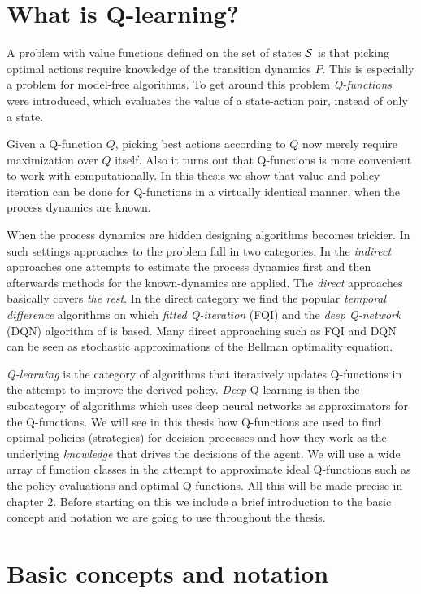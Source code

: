 \section{What is Q-learning?}

A problem with value functions defined on the set of states $\mathcal{S}$ is that
picking optimal actions require knowledge of the transition dynamics $P$.
This is especially a problem for model-free algorithms.
To get around this problem \emph{Q-functions} were introduced, which evaluates
the value of a state-action pair, instead of only a state.

Given a Q-function $Q$, picking best actions according to $Q$ now
merely require maximization over $Q$ itself.
Also it turns out that Q-functions is
more convenient to work with computationally.
In this thesis we show that value and policy iteration can be done
for Q-functions in a virtually identical manner, when the process dynamics
are known.

When the process dynamics are hidden designing algorithms becomes trickier.
In such settings approaches to the problem
fall in two categories. In the \emph{indirect} approaches
one attempts to estimate the process dynamics first and then afterwards
methods for the known-dynamics are applied.
The \emph{direct} approaches basically covers \emph{the rest}.
In the direct category we find the popular \emph{temporal difference}
algorithms on which \emph{fitted Q-iteration} (FQI)
and the \emph{deep Q-network} (DQN) algorithm of  is based.
Many direct approaching such as FQI and DQN can be seen as
stochastic approximations of the Bellman optimality equation.

\emph{Q-learning} is the category of algorithms that iteratively updates
Q-functions in the attempt to improve the derived policy.
\emph{Deep} Q-learning is then the subcategory of algorithms which
uses deep neural networks as approximators for the Q-functions.
We will see in this thesis how Q-functions are used to find optimal
policies (strategies) for decision processes and how they work
as the underlying \emph{knowledge} that drives the decisions of
the agent. We will use a wide array of function classes in the attempt
to approximate ideal Q-functions such as the policy evaluations and
optimal Q-functions.
All this will be made precise in chapter 2.
Before starting on this we include a brief introduction to the basic
concept and notation we are going to use throughout the thesis.

\section{Basic concepts and notation}

